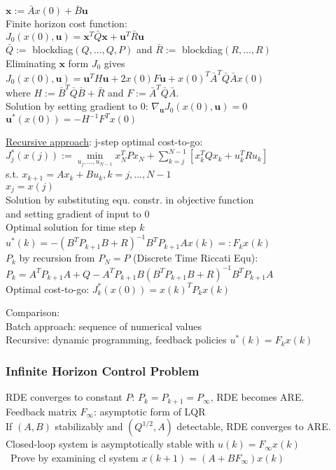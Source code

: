 \documentclass[10pt,parskip]{scrartcl}
\begin{document}
\begin{multicols*}{3}
$ \mathbf x := \bar A x(0) + \bar B \mathbf u $\\
Finite horizon cost function:\\
$ J_0(x(0),\mathbf u) = \mathbf x^T \bar Q \mathbf x + \mathbf u^T \bar R \mathbf u$\\
$ \bar Q := $ blockdiag$(Q, ...,Q,P)$ and $\bar R :=$ blockdiag$(R,...,R)$\\
Eliminating $\mathbf x$ form $J_0$ gives\\
$J_0(x(0),\mathbf u) = \mathbf u^T H \mathbf u + 2 x(0) F \mathbf u + x(0)^T \bar A^T \bar Q \bar A x(0)$\\
where $H := \bar B^T \bar Q \bar B + \bar R$ and $F := \bar A^T \bar Q \bar A$. \\
Solution by setting gradient to 0: $\nabla_{\mathbf u} J_0(x(0), \mathbf u) = 0$ \\
$\mathbf u^*(x(0)) = - H^{-1}F^T x(0)$

\underline{Recursive approach}: j-step optimal cost-to-go: \\
$ J_j^*(x(j)) := \min\limits_{u_j,...,u_{N-1}} x_N^T P x_N + \sum_{k=j}^{N-1} [x_k^T Q x_k + u_k^T R u_k]$\\
\hspace*{10mm}s.t. $x_{k+1} = A x_k + B u_k, k = j,...,N-1$\\
\hspace*{17mm}$x_j = x(j)$\\
Solution by substituting equ. constr. in objective function \\and setting gradient of input to 0\\
Optimal solution for time step $k$\\
$u^*(k) = -(B^T P_{k+1} B + R)^{-1} B^T P_{k+1} A x(k) =: F_k x(k) $ \\
$P_k$ by recursion from $P_N=P$ (Discrete Time Riccati Equ):\\
$P_k = A^T P_{k+1} A + Q - A^T P_{k+1} B(B^T P_{k+1} B + R)^{-1} B^T P_{k+1} A$\\
Optimal cost-to-go: $J_k^*(x(0)) = x(k)^T P_k x(k)$

Comparison: \\
Batch approach: sequence of numerical values\\
Recursive: dynamic programming, feedback policies $u^*(k) = F_k x(k)$


\subsubsection{Infinite Horizon Control Problem}
RDE converges to constant $P$: $P_k = P_{k+1} = P_\infty $, RDE becomes ARE.\\
Feedback matrix $F_\infty$: asymptotic form of LQR\\
If $(A,B)$ stabilizably and $(Q^{1/2}, A)$ detectable, RDE converges to ARE.\\
Closed-loop system is asymptotically stable with $u(k) = F_\infty x(k)$\\\
Prove by examining cl system $x(k+1) = (A+B F_\infty)x(k)$



\end{multicols*}
\end{document}
